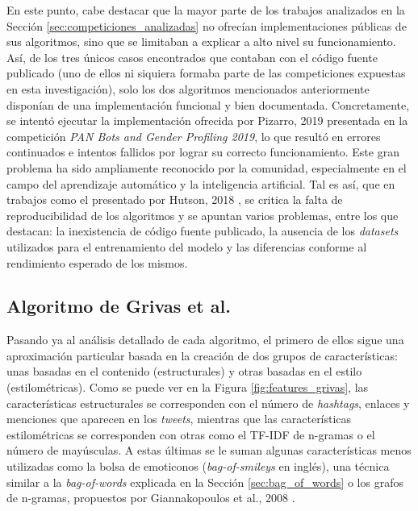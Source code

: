 \bigskip
En este punto, cabe destacar que la mayor parte de los trabajos analizados en la Sección \ref{sec:competiciones_analizadas} no ofrecían
implementaciones públicas de sus algoritmos, sino que se limitaban a explicar a alto nivel su funcionamiento. Así,
de los tres únicos casos encontrados que contaban con el código fuente publicado (uno de ellos ni siquiera formaba parte de las competiciones expuestas en esta investigación), solo los dos algoritmos mencionados anteriormente disponían de
una implementación funcional y bien documentada. Concretamente, se intentó ejecutar la implementación ofrecida por Pizarro, 2019 \cite{pizarro2019using}
presentada en la competición \textit{PAN Bots and Gender Profiling 2019}, lo que resultó en errores continuados e intentos fallidos por lograr su correcto funcionamiento.
Este gran problema ha sido ampliamente reconocido por la comunidad, especialmente en el campo del aprendizaje automático y la inteligencia artificial.
Tal es así, que en trabajos como el presentado por Hutson, 2018 \cite{hutson2018artificial}, se critica la falta de reproducibilidad de los algoritmos
y se apuntan varios problemas, entre los que destacan: la inexistencia de código fuente publicado, la ausencia de los \textit{datasets} utilizados para el entrenamiento
del modelo y las diferencias conforme al rendimiento esperado de los mismos.

\subsection{Algoritmo de Grivas et al. \cite{grivas2015author}}

Pasando ya al análisis detallado de cada algoritmo, el primero de ellos sigue una aproximación particular basada en la creación de dos grupos de características: unas basadas en el contenido (estructurales) y otras basadas en el estilo (estilométricas).
Como se puede ver en la Figura \ref{fig:features_grivas}, las características estructurales se corresponden con el número de \textit{hashtags}, enlaces y menciones que aparecen en los \textit{tweets},
mientras que las características estilométricas se corresponden con otras como el TF-IDF de n-gramas o el número de mayúsculas. A estas últimas se le suman algunas características menos
utilizadas como la bolsa de emoticonos (\textit{bag-of-smileys} en inglés), una técnica similar a la \textit{bag-of-words} explicada en la Sección \ref{sec:bag_of_words} o los grafos de n-gramas, propuestos
por Giannakopoulos et al., 2008 \cite{giannakopoulos2008summarization}.

